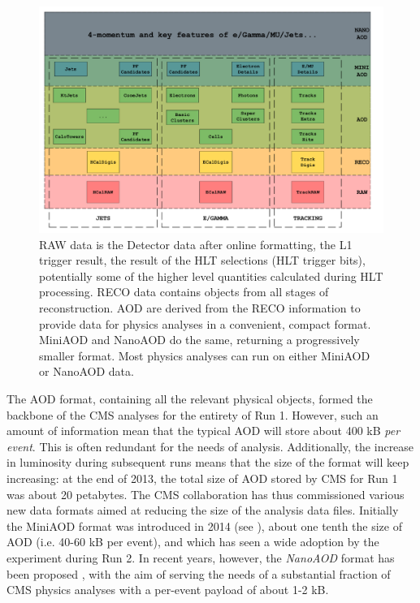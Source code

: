 \begin{figure}
    \centering
     \includegraphics[width=\columnwidth]{gfx/ch2/data_tiers.pdf}
    \caption[Data Tiers]{RAW data is the Detector data after online formatting, the L1 trigger result, the result of the HLT selections (HLT trigger bits), potentially some of the higher level quantities calculated during HLT processing. RECO data contains objects from all stages of reconstruction. AOD are derived from the RECO information to provide data for physics analyses in a convenient, compact format. MiniAOD and NanoAOD do the same, returning a progressively smaller format. Most physics analyses can run on either MiniAOD or NanoAOD data.}
    \label{fig:datatier}
\end{figure}

The AOD format, containing all the relevant physical objects, formed the backbone of the CMS analyses for the entirety of Run 1. However, such an amount of information mean that the typical AOD will store about 400 kB \emph{per event}. This is often redundant for the needs of analysis. Additionally, the increase in luminosity during subsequent runs means that the size of the format will keep increasing: at the end of 2013, the total size of AOD stored by CMS for Run 1 was about 20 petabytes. The CMS collaboration has thus commissioned various new data formats aimed at reducing the size of the analysis data files.
Initially the MiniAOD format was introduced in 2014 (see \cite{Petrucciani_2015}), about one tenth the size of AOD (i.e. 40-60 kB per event), and which has seen a wide adoption by the experiment during Run 2. In recent years, however, the \emph{NanoAOD} format has been proposed \cite{Rizzi:2699585}, with the aim of serving the needs of a substantial fraction of CMS physics analyses with a per-event payload of about 1-2 kB.

